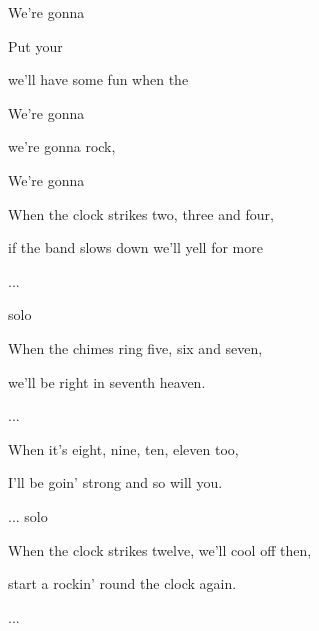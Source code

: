 

\zs 
{}



We're gonna 
\ks

\zs

Put your 

we'll have some fun when the 

We're gonna 

we're gonna rock, 

We're gonna   
\ks

\zs
When the clock strikes two, three and four,

if the band slows down we'll yell for more

...
\ks

\zs
solo
\ks

\zs
When the chimes ring five, six and seven,

we'll be right in seventh heaven.

...
\ks

\zs
When it's eight, nine, ten, eleven too,

I'll be goin' strong and so will you.

...
\ks
\zs
solo
\ks

\zs
When the clock strikes twelve, we'll cool off then,

start a rockin' round the clock again.

...
\ks

\kp
